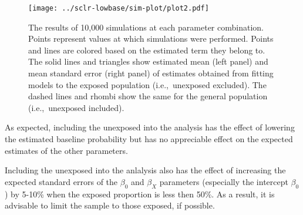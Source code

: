 \begin{figure}[htp]
	\centering
	\texttt{[image: ../sclr-lowbase/sim-plot/plot2.pdf]}
	\caption{
		The results of 10,000 simulations at each parameter combination. Points represent values at which simulations were performed. Points and lines are colored based on the estimated term they belong to. The solid lines and triangles show estimated mean (left panel) and mean standard error (right panel) of estimates obtained from fitting models to the exposed population (i.e.,~unexposed excluded). The dashed lines and rhombi show the same for the general population (i.e.,~unexposed included).
	}
	\label{fig:sclr-lowbase}
\end{figure}

As expected, including the unexposed into the analysis has the effect of lowering the estimated baseline probability but has no appreciable effect on the expected estimates of the other parameters.

Including the unexposed into the anlalysis also has the effect of increasing the expected standard errors of the \(\beta_0\) and $\beta_X$ parameters (especially the intercept \(\beta_0\)) by 5-10\% when the exposed proportion is less then 50\%. As a result, it is advisable to limit the sample to those exposed, if possible.
